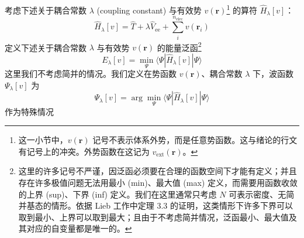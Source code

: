 考虑下述关于耦合常数 $\lambda$ (coupling constant) 与有效势 $v(\bm{r})$\footnote{这一小节中，$v(\bm{r})$ 记号不表示体系外势，而是任意势函数。这与绪论的行文有记号上的冲突。外势函数在这记为 $v_\mathrm{ext} (\bm{r})$。} 的算符 $\hat H_\lambda [v]$： 
\begin{equation}
  \label{eq.2.H-lambda}
  \hat H_\lambda [v] = \hat T + \lambda \hat V_\mathrm{ee} + \sum_i^{n_\mathrm{elec}} v(\bm{r}_i)
\end{equation}
定义下述关于耦合常数 $\lambda$ 与有效势 $v(\bm{r})$ 的能量泛函\footnote{这里的许多记号不严谨，因泛函必须要在合理的函数空间下才能有定义；并且存在许多极值问题无法用最小 (min)、最大值 (max) 定义，而需要用函数收敛的上界 (sup)、下界 (inf) 定义。我们在这里通常只考虑 $N$ 可表示密度、无简并基态的情形。依据 Lieb 工作\cite{Lieb-Lieb.IJQC.1983}中定理 3.3 的证明，这类情形下许多下界可以取到最小、上界可以取到最大；且由于不考虑简并情况，泛函最小、最大值及其对应的自变量都是唯一的。}
\begin{equation}
  \label{eq.2.E-lambda}
  E_\lambda [v] = \min_{\Psi} \langle \Psi | \hat H_\lambda [v] | \Psi \rangle 
\end{equation}
这里我们不考虑简并的情况。我们定义在势函数 $v(\bm{r})$、耦合常数 $\lambda$ 下，波函数 $\Psi_\lambda [v]$ 为
\begin{equation}
  \label{eq.2.E-lambda-psi}
  \Psi_\lambda [v] = \arg \min_{\Psi} \langle \Psi | \hat H_\lambda [v] | \Psi \rangle
\end{equation}
作为特殊情况
